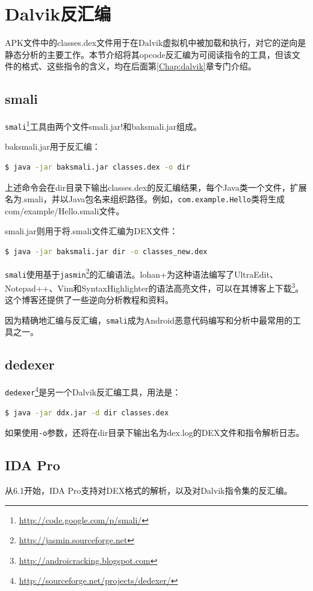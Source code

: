 \section{Dalvik反汇编}
APK文件中的classes.dex文件用于在Dalvik虚拟机中被加载和执行，对它的逆向是静态分析的主要工作。本节介绍将其opcode反汇编为可阅读指令的工具，但该文件的格式、这些指令的含义，均在后面第\ref{Chap:dalvik}章专门介绍。

\subsection{smali}
\lstinline!smali!\footnote{\url{http://code.google.com/p/smali/}}工具由两个文件smali.jar!和baksmali.jar组成。

baksmali.jar用于反汇编：
\begin{lstlisting}[language=bash, numbers=none]
 $ java -jar baksmali.jar classes.dex -o dir
\end{lstlisting}
上述命令会在dir目录下输出classes.dex的反汇编结果，每个Java类一个文件，扩展名为.smali，并以Java包名来组织路径。例如，\lstinline!com.example.Hello!类将生成com/example/Hello.smali文件。

smali.jar则用于将.smali文件汇编为DEX文件：
\begin{lstlisting}[language=bash, numbers=none]
 $ java -jar baksmali.jar dir -o classes_new.dex
\end{lstlisting}

\lstinline!smali!使用基于\lstinline!jasmin!\footnote{\url{http://jasmin.sourceforge.net}}的汇编语法。lohan+为这种语法编写了UltraEdit、Notepad++、Vim和SyntaxHighlighter的语法高亮文件，可以在其博客上下载\footnote{\url{http://androicracking.blogspot.com}}。这个博客还提供了一些逆向分析教程和资料。

因为精确地汇编与反汇编，\lstinline!smali!成为Android恶意代码编写和分析中最常用的工具之一。

\subsection{dedexer}
\lstinline!dedexer!\footnote{\url{http://sourceforge.net/projects/dedexer/}}是另一个Dalvik反汇编工具，用法是：
\begin{lstlisting}[language=bash, numbers=none]
 $ java -jar ddx.jar -d dir classes.dex
\end{lstlisting}
如果使用\lstinline!-o!参数，还将在dir目录下输出名为dex.log的DEX文件和指令解析日志。

\subsection{IDA Pro}
从6.1开始，IDA Pro支持对DEX格式的解析，以及对Dalvik指令集的反汇编。

